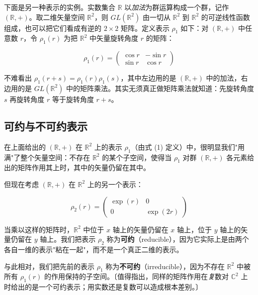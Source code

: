 下面是另一种表示的实例。实数集合 $\mathbb{R}$ 以\emph{加法}为群运算构成一个群，记作 $(\mathbb{R},+)$。取二维矢量空间 $\mathbb{R}^{2}$，则 $GL(\mathbb{R}^{2})$ 由一切从 $\mathbb{R}^{2}$ 到 $\mathbb{R}^{2}$ 的可逆线性函数组成，也可以把它们看成有逆的 $2\times2$ 矩阵。定义表示 $\rho_{1}$ 如下：对 $(\mathbb{R},+)$ 中任意数 $r$，令 $\rho_{1}(r)$ 为把 $\mathbb{R}^{2}$ 中矢量旋转角度 $r$ 的矩阵：

\begin{equation}
\rho_{1}(r)=\begin{pmatrix}\cos r & -\sin r\\ \sin r & \cos r\end{pmatrix} \tag{1}
\end{equation}

不难看出 $\rho_{1}(r+s)=\rho_{1}(r)\rho_{1}(s)$，其中左边用的是 $(\mathbb{R},+)$ 中的加法，右边用的是 $GL(\mathbb{R}^{2})$ 中的矩阵乘法。其实无须真正做矩阵乘法就知道：先旋转角度 $s$ 再旋转角度 $r$ 等于旋转角度 $r+s$。

\subsection{可约与不可约表示}

在上面给出的 $(\mathbb{R},+)$ 在 $\mathbb{R}^{2}$ 上的表示 $\rho_{1}$（由式 (1) 定义）中，很明显我们"用满"了整个矢量空间：不存在 $\mathbb{R}^{2}$ 的某个子空间，使得当 $\rho_{1}$ 对群 $(\mathbb{R},+)$ 各元素给出的矩阵作用其上时，其中的矢量仍留在其中。

但现在考虑 $(\mathbb{R},+)$ 在 $\mathbb{R}^{2}$ 上的另一个表示：

\begin{equation}
\rho_{2}(r)=\begin{pmatrix} \exp(r) & 0\\ 0 & \exp(2r)\end{pmatrix} \tag{2}
\end{equation}

当乘以这样的矩阵时，$\mathbb{R}^{2}$ 中位于 $x$ 轴上的矢量仍留在 $x$ 轴上，位于 $y$ 轴上的矢量仍留在 $y$ 轴上。我们把表示 $\rho_{2}$ 称为\textbf{可约}（reducible），因为它实际上是由两个各自一维的表示"粘在一起"，而不是一个真正二维的表示。

与此相对，我们把先前的表示 $\rho_{1}$ 称为\textbf{不可约}（irreducible），因为不存在 $\mathbb{R}^{2}$ 中被所有 $\rho_{1}(r)$ 的作用保持的子空间。〔值得指出，同样的矩阵作用在\emph{复}数对 $\mathbb{C}^{2}$ 上时给出的是一个可约表示；用实数还是复数可以造成根本差别。〕

